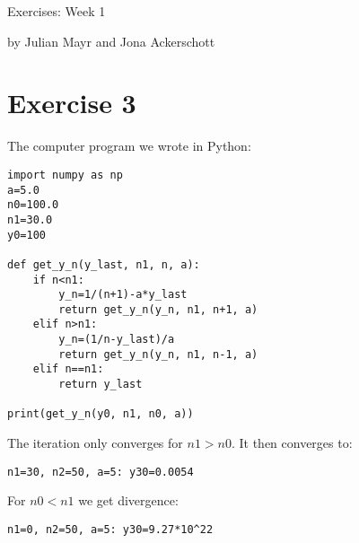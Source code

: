 \documentclass[12pt,a4paper,twoside]{article}
\begin{document}
\centerline{\large Exercises: Week 1}\vspace{0.5em}
\centerline{\large by Julian Mayr and Jona Ackerschott}\vspace{2em}

\section*{Exercise 3}
The computer program we wrote in Python:

\lstset{language=Python}
\begin{lstlisting}
import numpy as np
a=5.0
n0=100.0
n1=30.0
y0=100

def get_y_n(y_last, n1, n, a):
    if n<n1:
        y_n=1/(n+1)-a*y_last
        return get_y_n(y_n, n1, n+1, a)
    elif n>n1:
        y_n=(1/n-y_last)/a
        return get_y_n(y_n, n1, n-1, a)
    elif n==n1:
        return y_last

print(get_y_n(y0, n1, n0, a))

\end{lstlisting}

The iteration only converges for $n1>n0$. It then converges to:

\begin{verbatim}
n1=30, n2=50, a=5: y30=0.0054
\end{verbatim}

For $n0<n1$ we get divergence:

\begin{verbatim}
n1=0, n2=50, a=5: y30=9.27*10^22
\end{verbatim}
\end{document}
